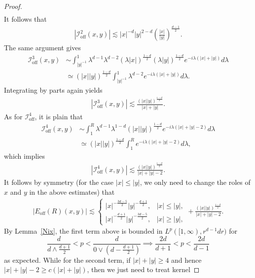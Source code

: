 \documentclass[12pt]{amsart}
\begin{document}
\begin{proof}
\begin{align*}
\end{align*}
It follows that
\begin{align*}
    |\mathcal{I}_{\mathrm{off}}^2(x,y)|\lesssim |x|^{-d} |y|^{2-d} \left(\frac{|x|}{|y|}\right)^{\frac{d-1}{2}}.
\end{align*}
The same argument gives
\begin{align*}
    \mathcal{I}_{\mathrm{off}}^3(x,y) &\sim \int_{|y|^{-1}}^1 \lambda^{d-1} \lambda^{d-2} (\lambda |x|)^{\frac{1-d}{2}} (\lambda |y|)^{\frac{1-d}{2}} e^{- i\lambda(|x|+|y|)} d\lambda\\
    &\simeq (|x||y|)^{\frac{1-d}{2}} \int_{|y|^{-1}}^1 \lambda^{d-2} e^{-i\lambda (|x|+|y|)} d\lambda.
\end{align*}
Integrating by parts again yields
\begin{align*}
    |\mathcal{I}_{\mathrm{off}}^3(x,y)|\lesssim \frac{(|x||y|)^{\frac{1-d}{2}}}{|x|+|y|}.
\end{align*}
As for $\mathcal{I}_{\mathrm{off}}^4$, it is plain that
\begin{align*}
    \mathcal{I}_{\mathrm{off}}^4(x,y) &\sim \int_1^R \lambda^{d-1} \lambda^{1-d} (|x||y|)^{\frac{1-d}{2}} e^{- i\lambda(|x|+|y|-2)} d\lambda \\
    &\simeq (|x||y|)^{\frac{1-d}{2}} \int_1^R e^{- i\lambda(|x|+|y|-2)} d\lambda,
\end{align*}
which implies 
\begin{align*}
    |\mathcal{I}_{\mathrm{off}}^4(x,y)| \lesssim \frac{(|x||y|)^{\frac{1-d}{2}}}{|x|+|y|-2}.
\end{align*}
It follows by symmetry (for the case $|x|\le |y|$, we only need to change the roles of $x$ and $y$ in the above estimates) that 
\begin{align*}
    |E_{\mathrm{off}}(R)(x,y)| \lesssim \begin{cases}
        |x|^{-\frac{3d-5}{2}} |y|^{-\frac{d+1}{2}}, & |x|\le |y|,\\
        |x|^{-\frac{d+1}{2}} |y|^{-\frac{3d-5}{2}}, & |x|\ge |y|,
    \end{cases} + \frac{(|x||y|)^{\frac{1-d}{2}}}{|x|+|y|-2}.
\end{align*}
By Lemma~\ref{Nix}, the first term above is bounded in $L^p([1,\infty),r^{d-1}dr)$ for 
\begin{equation*}
    \frac{d}{d \wedge \frac{d+1}{2}} < p < \frac{d}{0 \vee (d-\frac{d+1}{2})} \implies \frac{2d}{d+1}<p<\frac{2d}{d-1}
\end{equation*}
as expected. While for the second term, if $|x|+|y|\ge 4$ and hence $|x|+|y|-2 \ge c(|x|+|y|)$, then we just need to treat kernel

\end{proof}
\end{document}
